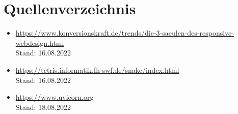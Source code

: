 \documentclass[a4paper,12pt]{scrartcl}
\begin{document}
\newpage

\section{Quellenverzeichnis}

\begin{itemize}
\item \url{https://www.konversionskraft.de/trends/die-3-saeulen-des-responsive-webdesign.html} \\ Stand: 16.08.2022
\item \url{https://tetris.informatik.fh-swf.de/snake/index.html} \\ Stand: 16.08.2022
\item \url{https://www.uvicorn.org} \\ Stand: 18.08.2022
\end{itemize}
\end{document}

